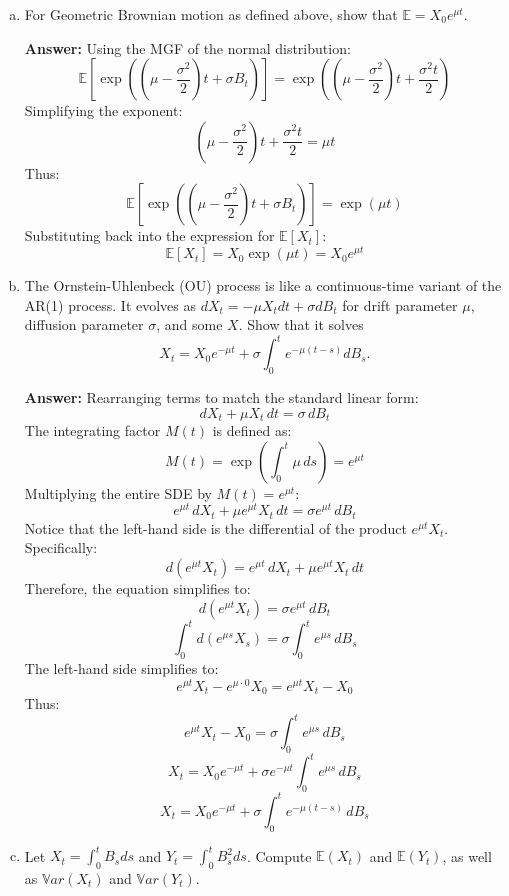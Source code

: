\documentclass[11pt]{extarticle}
\theoremstyle{plain}
\theoremstyle{definition}
\begin{document}
\begin{enumerate}[(a)]
\item For Geometric Brownian motion as defined above, show that $\mathbb E = X_0 e^{\mu t}$.

\textbf{Answer:} Using the MGF of the normal distribution:
\[
\mathbb{E}\left[ \exp\left( \left( \mu - \frac{\sigma^2}{2} \right) t + \sigma B_t \right) \right] = \exp\left( \left( \mu - \frac{\sigma^2}{2} \right) t + \frac{\sigma^2 t}{2} \right)
\]
Simplifying the exponent:
\[
\left( \mu - \frac{\sigma^2}{2} \right) t + \frac{\sigma^2 t}{2} = \mu t
\]
Thus:
\[
\mathbb{E}\left[ \exp\left( \left( \mu - \frac{\sigma^2}{2} \right) t + \sigma B_t \right) \right] = \exp\left( \mu t \right)
\]
Substituting back into the expression for \( \mathbb{E}[X_t] \):
\[
\mathbb{E}[X_t] = X_0 \exp\left( \mu t \right) = X_0 e^{\mu t}
\]

\item The Ornstein-Uhlenbeck (OU) process is like a continuous-time variant of the AR(1) process. It evolves as $dX_t = - \mu X_t dt + \sigma dB_t$ for drift parameter $\mu$, diffusion parameter $\sigma$, and some $X$. Show that it solves 
\begin{equation*}
	X_t = X_0 e^{- \mu t} + \sigma \int_0^t e^{-\mu(t - s)} dB_s.
\end{equation*}

\textbf{Answer:} Rearranging terms to match the standard linear form:
\[
dX_t + \mu X_t \, dt = \sigma \, dB_t
\]
The integrating factor \( M(t) \) is defined as:
\[
M(t) = \exp\left( \int_{0}^{t} \mu \, ds \right) = e^{\mu t}
\]
Multiplying the entire SDE by \( M(t) = e^{\mu t} \):
\[
e^{\mu t} \, dX_t + \mu e^{\mu t} X_t \, dt = \sigma e^{\mu t} \, dB_t
\]
Notice that the left-hand side is the differential of the product \( e^{\mu t} X_t \). Specifically:
\[
d\left( e^{\mu t} X_t \right) = e^{\mu t} \, dX_t + \mu e^{\mu t} X_t \, dt
\]
Therefore, the equation simplifies to:
\[
d\left( e^{\mu t} X_t \right) = \sigma e^{\mu t} \, dB_t
\]
\[
\int_{0}^{t} d\left( e^{\mu s} X_s \right) = \sigma \int_{0}^{t} e^{\mu s} \, dB_s
\]
The left-hand side simplifies to:
\[
e^{\mu t} X_t - e^{\mu \cdot 0} X_0 = e^{\mu t} X_t - X_0
\]
Thus:
\[
e^{\mu t} X_t - X_0 = \sigma \int_{0}^{t} e^{\mu s} \, dB_s
\]
\[
X_t = X_0 e^{-\mu t} + \sigma e^{-\mu t} \int_{0}^{t} e^{\mu s} \, dB_s
\]
\[
X_t = X_0 e^{-\mu t} + \sigma \int_{0}^{t} e^{-\mu (t - s)} \, dB_s
\]

\item Let $X_t = \int_0^t B_s ds$ and $Y_t = \int_0^t B_s^2 ds$. Compute $\mathbb E(X_t)$ and $\mathbb E(Y_t)$, as well as $\mathbb Var(X_t)$ and $\mathbb Var(Y_t)$. 
\end{enumerate}
\end{document}
